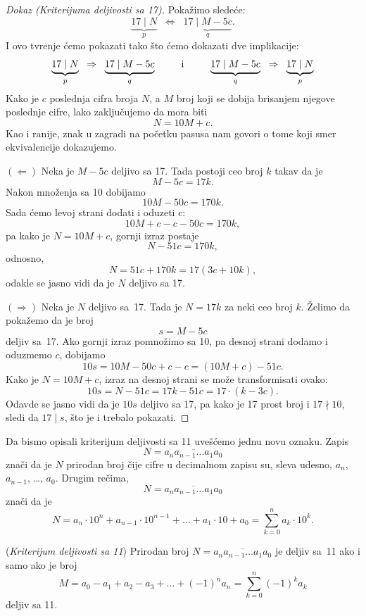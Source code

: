 \begin{proof}[Dokaz (Kriterijuma deljivosti sa 17)]
  Poka\v zimo slede\'ce:
  $$
    \underbrace{17 \mid N}_p \;\;\Leftrightarrow\;\; \underbrace{17 \mid M - 5c}_q.
  $$
  I ovo tvr\dj enje \'cemo pokazati tako \v sto \'cemo dokazati dve implikacije:
  $$
    \underbrace{17 \mid N}_p \;\;\Rightarrow\;\; \underbrace{17 \mid M - 5c}_q
    \;\;\text{\qquad i\qquad}\;\;
    \underbrace{17 \mid M - 5c}_q \;\;\Rightarrow\;\; \underbrace{17 \mid N}_p
  $$
  Kako je $c$ poslednja cifra broja $N$, a $M$ broj koji se dobija brisanjem njegove poslednje cifre, lako
  zaklju\v cujemo da mora biti
  $$
    N = 10 M + c.
  $$
  Kao i ranije, znak u zagradi na po\v cetku pasusa nam govori o tome koji smer ekvivalencije dokazujemo.
   
  $(\Leftarrow)$
  Neka je $M - 5c$ deljivo sa 17. Tada postoji ceo broj $k$ takav da je
  $$
    M - 5c = 17k.
  $$
  Nakon mno\v zenja sa 10 dobijamo
  $$
    10M - 50c = 170 k.
  $$
  Sada \'cemo levoj strani dodati i oduzeti c:
  $$
    10M + c - c - 50c = 170 k,
  $$
  pa kako je $N = 10M + c$, gornji izraz postaje
  $$
    N - 51c = 170k,
  $$
  odnosno,
  $$
    N = 51c + 170k = 17(3c + 10k),
  $$
  odakle se jasno vidi da je $N$ deljivo sa 17.

  $(\Rightarrow)$
  Neka je $N$ deljivo sa~17. Tada je $N = 17k$ za neki ceo broj $k$. \v Zelimo da poka\v zemo da je broj
  $$
    s = M - 5c
  $$
  deljiv sa~17. Ako gornji izraz pomno\v zimo sa 10, pa desnoj strani dodamo i oduzmemo $c$, dobijamo
  $$
    10s = 10M - 50c + c - c = (10M + c) - 51c.
  $$
  Kako je $N = 10M + c$, izraz na desnoj strani se mo\v ze transformisati ovako:
  $$
    10s = N - 51c = 17k - 51c = 17 \cdot (k - 3c).
  $$
  Odavde se jasno vidi da je $10s$ deljivo sa 17, pa kako je 17 prost broj i $17 \nmid 10$, sledi da $17 \mid s$,
  \v sto je i trebalo pokazati.
\end{proof}

Da bismo opisali kriterijum deljivosti sa 11 uve\v s\'cemo jednu novu oznaku. Zapis
$$
  N = \overline{a_n a_{n-1} \ldots a_1 a_0}
$$
zna\v ci da je $N$ prirodan broj \v cije cifre u decimalnom zapisu su, sleva udesno, $a_n$, $a_{n-1}$, \ldots, $a_0$.
Drugim re\v cima,
$$
  N = \overline{a_n a_{n-1} \ldots a_1 a_0}
$$
zna\v ci da je
$$
  N = a_n \cdot 10^n + a_{n-1} \cdot 10^{n-1} + \ldots + a_1 \cdot 10 + a_0 = \sum_{k=0}^n a_k \cdot 10^k.
$$

\begin{EX} (\textit{Kriterijum deljivosti sa 11})
  Prirodan broj $N = \overline{a_n a_{n-1} \ldots a_1 a_0}$ je deljiv sa~11 ako i samo ako je broj
  $$
    M = a_0 - a_1 + a_2 - a_3 + \ldots + (-1)^n a_n = \sum_{k=0}^n (-1)^k a_k
  $$
  deljiv sa 11.
\end{EX}

